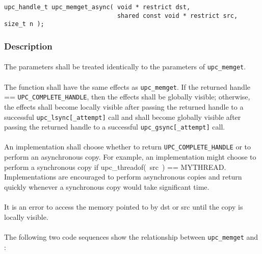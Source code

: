 \documentclass[10pt]{article}
\def \memget  {{\tt upc\_memget}}
\def \gsync  {{\tt upc\_gsync[\_attempt]}}
\def \lsync  {{\tt upc\_lsync[\_attempt]}}
\def \complete {{\tt UPC\_COMPLETE\_HANDLE}}
\begin{document}
\begin{verbatim}
upc_handle_t upc_memget_async( void * restrict dst,
                               shared const void * restrict src, size_t n );
\end{verbatim}

\subsubsection{Description}

\paragraph{} The parameters shall be treated identically to the parameters of
\memget{}.

\paragraph{} The \function{} function shall have the same effects as \memget{}.
If the returned handle == \complete{}, then the effects shall be globally
visible; otherwise, the effects shall become locally visible after passing the
returned handle to a successful \lsync{} call and shall become globally visible
after passing the returned handle to a successful \gsync{} call.  

\paragraph{} An implementation shall choose whether to return \complete{} or to
perform an asynchronous copy.  For example, an implementation might choose to
perform a synchronous copy if upc\_threadof(~src~) == MYTHREAD.  Implementations
are encouraged to perform asynchronous copies and return quickly whenever a
synchronous copy would take significant time.

\paragraph{} It is an error to access the memory pointed to by dst or src until
the copy is locally visible.

\paragraph{} The following two code sequences show the relationship between
\memget{} and \function{}:
\end{document}
